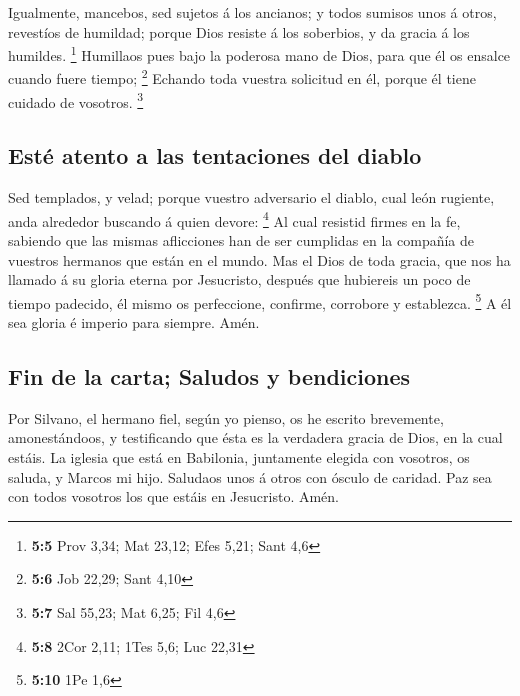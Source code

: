  Igualmente, mancebos, sed sujetos á los ancianos; y todos
sumisos unos á otros, revestíos de humildad; porque Dios resiste á los
soberbios, y da gracia á los humildes. \footnote{\textbf{5:5} Prov 3,34;
  Mat 23,12; Efes 5,21; Sant 4,6}  Humillaos pues bajo la
poderosa mano de Dios, para que él os ensalce cuando fuere tiempo;
\footnote{\textbf{5:6} Job 22,29; Sant 4,10}  Echando toda
vuestra solicitud en él, porque él tiene cuidado de vosotros.
\footnote{\textbf{5:7} Sal 55,23; Mat 6,25; Fil 4,6}

\hypertarget{estuxe9-atento-a-las-tentaciones-del-diablo}{%
\subsection{Esté atento a las tentaciones del
diablo}\label{estuxe9-atento-a-las-tentaciones-del-diablo}}

 Sed templados, y velad; porque vuestro adversario el
diablo, cual león rugiente, anda alrededor buscando á quien devore:
\footnote{\textbf{5:8} 2Cor 2,11; 1Tes 5,6; Luc 22,31}  Al
cual resistid firmes en la fe, sabiendo que las mismas aflicciones han
de ser cumplidas en la compañía de vuestros hermanos que están en el
mundo.  Mas el Dios de toda gracia, que nos ha llamado á su
gloria eterna por Jesucristo, después que hubiereis un poco de tiempo
padecido, él mismo os perfeccione, confirme, corrobore y establezca.
\footnote{\textbf{5:10} 1Pe 1,6}  A él sea gloria é imperio
para siempre. Amén.

\hypertarget{fin-de-la-carta-saludos-y-bendiciones}{%
\subsection{Fin de la carta; Saludos y
bendiciones}\label{fin-de-la-carta-saludos-y-bendiciones}}

 Por Silvano, el hermano fiel, según yo pienso, os he
escrito brevemente, amonestándoos, y testificando que ésta es la
verdadera gracia de Dios, en la cual estáis.  La iglesia
que está en Babilonia, juntamente elegida con vosotros, os saluda, y
Marcos mi hijo.  Saludaos unos á otros con ósculo de
caridad. Paz sea con todos vosotros los que estáis en Jesucristo. Amén.
